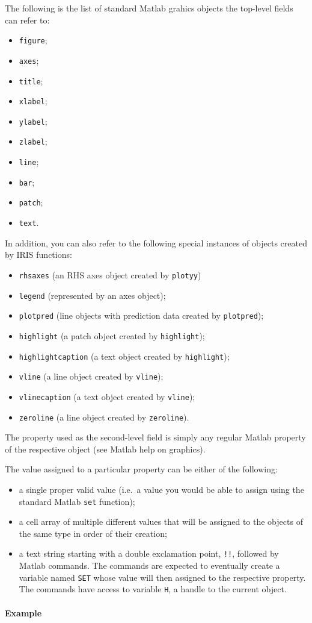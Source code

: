 The following is the list of standard Matlab grahics objects the
top-level fields can refer to:

\begin{itemize}
\itemsep1pt\parskip0pt
\item
  \texttt{figure};
\item
  \texttt{axes};
\item
  \texttt{title};
\item
  \texttt{xlabel};
\item
  \texttt{ylabel};
\item
  \texttt{zlabel};
\item
  \texttt{line};
\item
  \texttt{bar};
\item
  \texttt{patch};
\item
  \texttt{text}.
\end{itemize}

In addition, you can also refer to the following special instances of
objects created by IRIS functions:

\begin{itemize}
\itemsep1pt\parskip0pt
\item
  \texttt{rhsaxes} (an RHS axes object created by \texttt{plotyy})
\item
  \texttt{legend} (represented by an axes object);
\item
  \texttt{plotpred} (line objects with prediction data created by
  \texttt{plotpred});
\item
  \texttt{highlight} (a patch object created by \texttt{highlight});
\item
  \texttt{highlightcaption} (a text object created by
  \texttt{highlight});
\item
  \texttt{vline} (a line object created by \texttt{vline});
\item
  \texttt{vlinecaption} (a text object created by \texttt{vline});
\item
  \texttt{zeroline} (a line object created by \texttt{zeroline}).
\end{itemize}

The property used as the second-level field is simply any regular Matlab
property of the respective object (see Matlab help on graphics).

The value assigned to a particular property can be either of the
following:

\begin{itemize}
\item
  a single proper valid value (i.e.~a value you would be able to assign
  using the standard Matlab \texttt{set} function);
\item
  a cell array of multiple different values that will be assigned to the
  objects of the same type in order of their creation;
\item
  a text string starting with a double exclamation point, \texttt{!!},
  followed by Matlab commands. The commands are expected to eventually
  create a variable named \texttt{SET} whose value will then assigned to
  the respective property. The commands have access to variable
  \texttt{H}, a handle to the current object.
\end{itemize}

\paragraph{Example}


